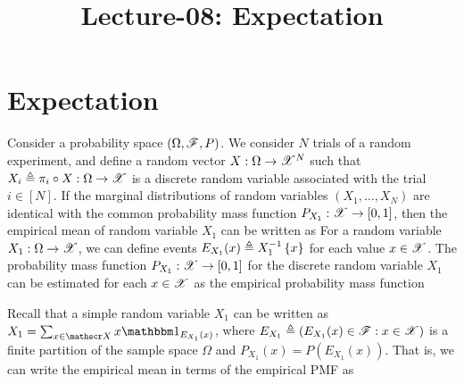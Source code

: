 \documentclass[letterpaper,10pt,english]{article}
\title{Lecture-08: Expectation}
\author{}
\begin{document}
\maketitle

\section{Expectation}
\begin{shaded}
\begin{exmp}
Consider a probability space $(\Omega, \mathscr{F}, P)$.
We consider $N$ trials of a random experiment, 
and define a random vector $X: \Omega \to \mathscr{X}^N$ 
such that $X_i \triangleq \pi_i\circ X :\Omega \to\mathscr{X}$ is a discrete random variable associated with the trial $i \in [N]$.   
If the marginal distributions of random variables $(X_1, \dots, X_N)$ are identical with the common probability mass function $P_{X_1}: \mathscr{X} \to [0,1]$,  
then the empirical mean of random variable $X_1$ can be written as 
For a random variable $X_1: \Omega \to \mathscr{X}$, 
we can define events $E_{X_1}(x) \triangleq X_1^{-1}\left\{x\right\}$ for each value $x \in \mathscr{X}$.  
The probability mass function $P_{X_1}:\mathscr{X} \to [0,1]$ for the discrete random variable $X_1$ can be estimated for each $x \in \mathscr{X}$ as the empirical probability mass function

Recall that a simple random variable $X_1$ can be written as $X_1 = \sum_{x \in \sX}x\Ind{E_{X_1}(x)}$, 
where $E_{X_1} \triangleq (E_{X_1}(x) \in \mathscr{F}: x \in \mathscr{X})$ is a finite partition of the sample space $\Omega$ and $P_{X_1}(x) = P(E_{X_1}(x))$. 
That is, we can write the empirical mean in terms of the empirical PMF as 
\end{exmp}
\end{shaded}
\end{document}
